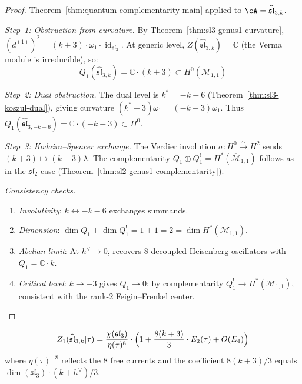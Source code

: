 \begin{proof}
Theorem~\ref{thm:quantum-complementarity-main} applied to $\cA = \widehat{\mathfrak{sl}}_{3,k}$.

\emph{Step~1: Obstruction from curvature.}
By Theorem~\ref{thm:sl3-genus1-curvature}, $(d^{(1)})^2 = (k+3) \cdot \omega_1 \cdot \operatorname{id}_{\mathfrak{sl}_3}$.  At generic level, $Z(\widehat{\mathfrak{sl}}_{3,k}) = \mathbb{C}$ (the Verma module is irreducible), so:
\begin{equation}
Q_1(\widehat{\mathfrak{sl}}_{3,k}) = \mathbb{C} \cdot (k+3) \subset H^0(\overline{\mathcal{M}}_{1,1})
\end{equation}

\emph{Step~2: Dual obstruction.}
The dual level is $k^* = -k-6$ (Theorem~\ref{thm:sl3-koszul-dual}), giving curvature $(k^*+3)\omega_1 = (-k-3)\omega_1$.  Thus $Q_1(\widehat{\mathfrak{sl}}_{3,-k-6}) = \mathbb{C}\cdot(-k-3) \subset H^0$.

\emph{Step~3: Kodaira--Spencer exchange.}
The Verdier involution $\sigma\colon H^0 \xrightarrow{\sim} H^2$ sends $(k+3) \mapsto (k+3)\lambda$.  The complementarity $Q_1 \oplus Q_1^! = H^*(\overline{\mathcal{M}}_{1,1})$ follows as in the $\mathfrak{sl}_2$ case (Theorem~\ref{thm:sl2-genus1-complementarity}).

\emph{Consistency checks.}
\begin{enumerate}
\item \emph{Involutivity}: $k \leftrightarrow -k-6$ exchanges summands. \checkmark
\item \emph{Dimension}: $\dim Q_1 + \dim Q_1^! = 1+1 = 2 = \dim H^*(\overline{\mathcal{M}}_{1,1})$. \checkmark
\item \emph{Abelian limit}: At $h^\vee \to 0$, recovers 8 decoupled Heisenberg oscillators with $Q_1 = \mathbb{C}\cdot k$. \checkmark
\item \emph{Critical level}: $k \to -3$ gives $Q_1 \to 0$; by complementarity $Q_1^! \to H^*(\overline{\mathcal{M}}_{1,1})$, consistent with the rank-2 Feigin--Frenkel center. \checkmark
\end{enumerate}
\end{proof}

\begin{proposition}
\label{prop:sl3-genus1-partition}
\begin{equation}\label{eq:sl3-genus1-partition}
Z_1(\widehat{\mathfrak{sl}}_{3,k}|\tau) = \frac{\chi(\mathfrak{sl}_3)}{\eta(\tau)^8} \cdot \Bigl(1 + \frac{8(k+3)}{3} \cdot E_2(\tau) + O(E_4)\Bigr)
\end{equation}
where $\eta(\tau)^{-8}$ reflects the $8$ free currents and the coefficient $8(k+3)/3$ equals $\dim(\mathfrak{sl}_3) \cdot (k+h^\vee)/3$.
\end{proposition}

